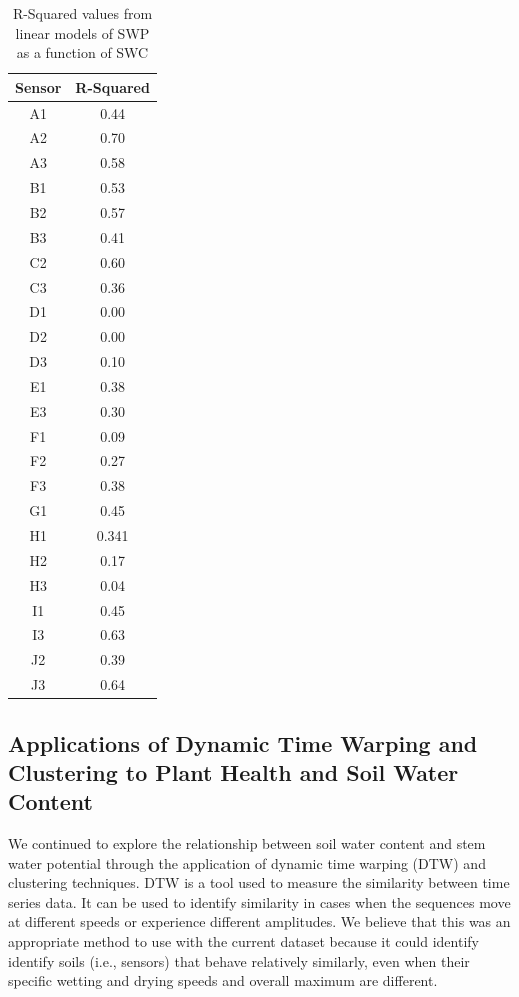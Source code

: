 \documentclass[12pt]{scrartcl}
\begin{document}
\begin{table}[!htb]
\centering
\caption{R-Squared values from linear models of SWP as a function of SWC}
\label{tab:linear}
\begin{tabular}{@{}cc@{}}
\toprule
\textbf{Sensor} & \textbf{R-Squared} \\ \midrule
A1            & 0.44               \\
A2            & 0.70               \\
A3            & 0.58               \\
B1            & 0.53               \\
B2            & 0.57               \\
B3            & 0.41               \\
C2            & 0.60               \\
C3            & 0.36               \\
D1            & 0.00               \\
D2            & 0.00               \\
D3            & 0.10               \\
E1            & 0.38               \\
E3            & 0.30               \\
F1            & 0.09               \\
F2            & 0.27               \\
F3            & 0.38               \\
G1            & 0.45               \\
H1            & 0.341              \\
H2            & 0.17               \\
H3            & 0.04               \\
I1            & 0.45               \\
I3            & 0.63               \\
J2            & 0.39               \\
J3            & 0.64               \\ \bottomrule
\end{tabular}
\end{table}

\subsection{Applications of Dynamic Time Warping and Clustering to Plant Health and Soil Water Content}
We continued to explore the relationship between soil water content and stem water potential through the application of dynamic time warping (DTW) and clustering techniques. DTW is a tool used to measure the similarity between time series data. It can be used to identify similarity in cases when the sequences move at different speeds or experience different amplitudes. We believe that this was an appropriate method to use with the current dataset because it could identify identify soils (i.e., sensors) that behave relatively similarly, even when their specific wetting and drying speeds and overall maximum are different.
\end{document}
